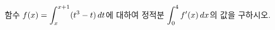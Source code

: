 함수 $f(x)=\displaystyle\int_{x}^{x+1} (t^3-t)\mkern3mu dt$에 대하여 정적분 $\displaystyle\int_{0}^{4} f'(x)\mkern3mu dx$의 값을 구하시오.
